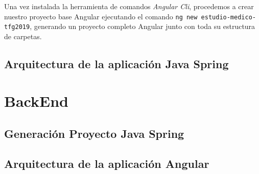     \FloatBarrier
    
    Una vez instalada la herramienta de comandos \textit{Angular Cli}, procedemos a crear nuestro proyecto base Angular ejecutando el comando \texttt{ng new estudio-medico-tfg2019}, generando un proyecto completo Angular junto con toda su estructura de carpetas.
    
    
    
    \subsection{Arquitectura de la aplicación Java Spring}
    
    
    \section{BackEnd}
    \subsection{Generación Proyecto Java Spring}
    \subsection{Arquitectura de la aplicación Angular}